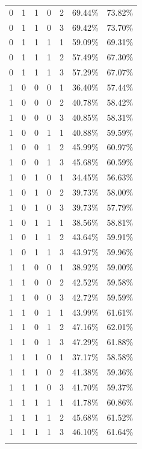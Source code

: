 \begin{longtable}{rrrrrrr}
	0     & 1     & 1     & 0     & 2     & 69.44\% & 73.82\% \\
	0     & 1     & 1     & 0     & 3     & 69.42\% & 73.70\% \\
	0     & 1     & 1     & 1     & 1     & 59.09\% & 69.31\% \\
	0     & 1     & 1     & 1     & 2     & 57.49\% & 67.30\% \\
	0     & 1     & 1     & 1     & 3     & 57.29\% & 67.07\% \\
	1     & 0     & 0     & 0     & 1     & 36.40\% & 57.44\% \\
	1     & 0     & 0     & 0     & 2     & 40.78\% & 58.42\% \\
	1     & 0     & 0     & 0     & 3     & 40.85\% & 58.31\% \\
	1     & 0     & 0     & 1     & 1     & 40.88\% & 59.59\% \\
	1     & 0     & 0     & 1     & 2     & 45.99\% & 60.97\% \\
	1     & 0     & 0     & 1     & 3     & 45.68\% & 60.59\% \\
	1     & 0     & 1     & 0     & 1     & 34.45\% & 56.63\% \\
	1     & 0     & 1     & 0     & 2     & 39.73\% & 58.00\% \\
	1     & 0     & 1     & 0     & 3     & 39.73\% & 57.79\% \\
	1     & 0     & 1     & 1     & 1     & 38.56\% & 58.81\% \\
	1     & 0     & 1     & 1     & 2     & 43.64\% & 59.91\% \\
	1     & 0     & 1     & 1     & 3     & 43.97\% & 59.96\% \\
	1     & 1     & 0     & 0     & 1     & 38.92\% & 59.00\% \\
	1     & 1     & 0     & 0     & 2     & 42.52\% & 59.58\% \\
	1     & 1     & 0     & 0     & 3     & 42.72\% & 59.59\% \\
	1     & 1     & 0     & 1     & 1     & 43.99\% & 61.61\% \\
	1     & 1     & 0     & 1     & 2     & 47.16\% & 62.01\% \\
	1     & 1     & 0     & 1     & 3     & 47.29\% & 61.88\% \\
	1     & 1     & 1     & 0     & 1     & 37.17\% & 58.58\% \\
	1     & 1     & 1     & 0     & 2     & 41.38\% & 59.36\% \\
	1     & 1     & 1     & 0     & 3     & 41.70\% & 59.37\% \\
	1     & 1     & 1     & 1     & 1     & 41.78\% & 60.86\% \\
	1     & 1     & 1     & 1     & 2     & 45.68\% & 61.52\% \\
	1     & 1     & 1     & 1     & 3     & 46.10\% & 61.64\% \\
	\bottomrule
	\label{tab:preprocessing-params}
\end{longtable}%

